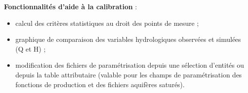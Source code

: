 \documentclass[11pt,french]{book}
\begin{document}
\textbf{Fonctionnalités d'aide à la calibration} : 
\begin{itemize}
    \item calcul des critères statistiques au droit des points de mesure ;
    \item graphique de comparaison des variables hydrologiques observées et simulées (Q et H) ;
    \item modification des fichiers de paramétrisation depuis une sélection d'entités ou depuis la table attributaire (valable pour les champs de paramétrisation des fonctions de production et des fichiers aquifères saturés).\\
\end{itemize}
\end{document}

